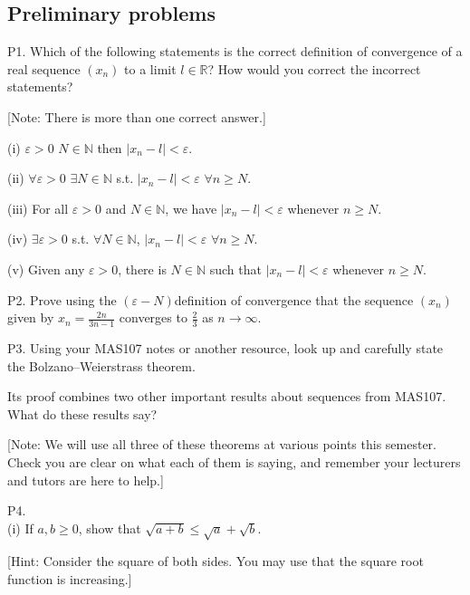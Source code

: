 \documentclass[letterpaper,10pt,english]{jupyterBook}
\begin{document}
\subsection{Preliminary problems}
\label{\detokenize{Problems:preliminary-problems}}\label{\detokenize{Problems:p1}}
\sphinxAtStartPar
P1. Which of the following statements is the correct definition of convergence of a real sequence \((x_n)\) to a limit \(l\in\mathbb{R}\)? How would you correct the incorrect statements?

{[}Note: There is more than one correct answer.{]}

\sphinxAtStartPar
(i) \(\varepsilon>0\) \(N\in\mathbb{N}\) then \(|x_n-l|<\varepsilon\).

\sphinxAtStartPar
(ii) \(\forall\varepsilon>0\) \(\exists N\in\mathbb{N}\) s.t.  \(|x_n-l|<\varepsilon\) \(\forall n\geq N\).

\sphinxAtStartPar
(iii) For all \(\varepsilon>0\) and \(N\in\mathbb{N}\), we have \(|x_n-l|<\varepsilon\) whenever \(n\geq N\).

\sphinxAtStartPar
(iv) \(\exists\varepsilon>0\) s.t. \(\forall N\in\mathbb{N}\), \(|x_n-l|<\varepsilon\) \(\forall n\geq N\).

\sphinxAtStartPar
(v) Given any \(\varepsilon>0\), there is \(N\in\mathbb{N}\) such that \(|x_n-l|<\varepsilon\) whenever \(n\geq N\).


\label{\detokenize{Problems:p2}}
\sphinxAtStartPar
P2. Prove using the \((\varepsilon-N)\)\sphinxhyphen{}definition of convergence that the sequence \((x_n)\) given by \(x_n = \frac{2n}{3n-1}\) converges to \(\frac{2}{3}\) as \(n\rightarrow\infty\).


\label{\detokenize{Problems:p3}}
\sphinxAtStartPar
P3. Using your MAS107 notes or another resource, look up and carefully state the Bolzano–Weierstrass theorem.

Its proof combines two other important results about sequences from MAS107. What do these results say?

{[}Note: We will use all three of these theorems at various points this semester. Check you are clear on what each of them is saying, and remember your lecturers and tutors are here to help.{]}


\label{\detokenize{Problems:p4}}
\sphinxAtStartPar
P4.\\
(i) If \(a, b \geq 0\), show that \(\sqrt{a + b} \leq \sqrt{a} + \sqrt{b}\).

{[}Hint: Consider the square of both sides. You may use that the square root function is increasing.{]}
\end{document}
